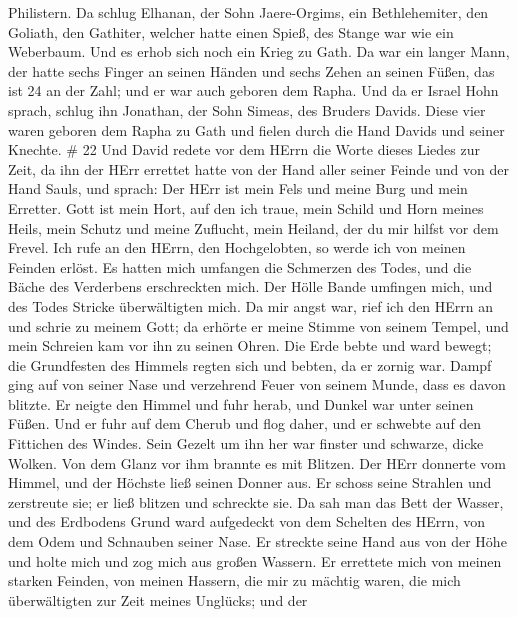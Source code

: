 Philistern. Da schlug Elhanan, der Sohn Jaere-Orgims, ein Bethlehemiter,
den Goliath, den Gathiter, welcher hatte einen Spieß, des Stange war wie
ein Weberbaum.  Und es erhob sich noch ein Krieg zu Gath.
Da war ein langer Mann, der hatte sechs Finger an seinen Händen und
sechs Zehen an seinen Füßen, das ist 24 an der Zahl; und er war auch
geboren dem Rapha.  Und da er Israel Hohn sprach, schlug
ihn Jonathan, der Sohn Simeas, des Bruders Davids.  Diese
vier waren geboren dem Rapha zu Gath und fielen durch die Hand Davids
und seiner Knechte. \# 22  Und David redete vor dem HErrn
die Worte dieses Liedes zur Zeit, da ihn der HErr errettet hatte von der
Hand aller seiner Feinde und von der Hand Sauls, und sprach:
 Der HErr ist mein Fels und meine Burg und mein Erretter.
 Gott ist mein Hort, auf den ich traue, mein Schild und Horn
meines Heils, mein Schutz und meine Zuflucht, mein Heiland, der du mir
hilfst vor dem Frevel.  Ich rufe an den HErrn, den
Hochgelobten, so werde ich von meinen Feinden erlöst.  Es
hatten mich umfangen die Schmerzen des Todes, und die Bäche des
Verderbens erschreckten mich.  Der Hölle Bande umfingen
mich, und des Todes Stricke überwältigten mich.  Da mir
angst war, rief ich den HErrn an und schrie zu meinem Gott; da erhörte
er meine Stimme von seinem Tempel, und mein Schreien kam vor ihn zu
seinen Ohren.  Die Erde bebte und ward bewegt; die
Grundfesten des Himmels regten sich und bebten, da er zornig war.
 Dampf ging auf von seiner Nase und verzehrend Feuer von
seinem Munde, dass es davon blitzte.  Er neigte den Himmel
und fuhr herab, und Dunkel war unter seinen Füßen.  Und er
fuhr auf dem Cherub und flog daher, und er schwebte auf den Fittichen
des Windes.  Sein Gezelt um ihn her war finster und
schwarze, dicke Wolken.  Von dem Glanz vor ihm brannte es
mit Blitzen.  Der HErr donnerte vom Himmel, und der Höchste
ließ seinen Donner aus.  Er schoss seine Strahlen und
zerstreute sie; er ließ blitzen und schreckte sie.  Da sah
man das Bett der Wasser, und des Erdbodens Grund ward aufgedeckt von dem
Schelten des HErrn, von dem Odem und Schnauben seiner Nase.
 Er streckte seine Hand aus von der Höhe und holte mich und
zog mich aus großen Wassern.  Er errettete mich von meinen
starken Feinden, von meinen Hassern, die mir zu mächtig waren,
 die mich überwältigten zur Zeit meines Unglücks; und der
